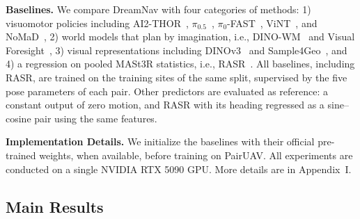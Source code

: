 \noindent \textbf{Baselines.} We compare DreamNav with four categories of methods: 1) visuomotor policies including AI2-THOR~\citep{7989381}, $\pi_{0.5}$~\citep{intelligence2025pi_}, $\pi_0$-FAST~\citep{pertsch2025fast}, ViNT~\citep{shah2023vint}, and NoMaD~\citep{sridhar2024nomad}, 2) world models that plan by imagination, i.e., DINO-WM~\citep{zhou2025dinowm} and Visual Foresight~\citep{ebert2018visual}, 3) visual representations including DINOv3~\citep{simeoni2025dinov3} and Sample4Geo~\citep{deuser2023sample4geo}, and 4) a regression on pooled MASt3R statistics, i.e., RASR~\citep{liang2026rasr}. All baselines, including RASR, are trained on the training sites of the same split, supervised by the five pose parameters of each pair. Other predictors are evaluated as reference: a constant output of zero motion, and RASR with its heading regressed as a sine--cosine pair using the same features.

\noindent \textbf{Implementation Details.} We initialize the baselines with their official pre-trained weights, when available, before training on PairUAV. All experiments are conducted on a single NVIDIA RTX 5090 GPU. More details are in Appendix~I.

\subsection{Main Results}

